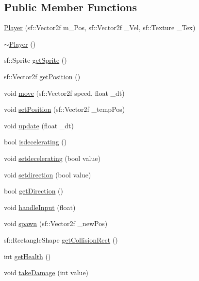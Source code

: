 \subsection*{Public Member Functions}
\begin{DoxyCompactItemize}
\item 
\hyperlink{class_player_a50b4f692a8315358192c8d955cf1250d}{Player} (sf\+::\+Vector2f m\+\_\+\+Pos, sf\+::\+Vector2f \+\_\+\+Vel, sf\+::\+Texture \+\_\+\+Tex)
\item 
\hyperlink{class_player_a749d2c00e1fe0f5c2746f7505a58c062}{$\sim$\+Player} ()
\item 
sf\+::\+Sprite \hyperlink{class_player_aabef659f696be314cdb705a1ce77ec2a}{get\+Sprite} ()
\item 
sf\+::\+Vector2f \hyperlink{class_player_a23356f99a9de86d3d47eadb679b332dc}{get\+Position} ()
\item 
void \hyperlink{class_player_a1b72ddc438471f7feb33b2b0b32cf303}{move} (sf\+::\+Vector2f speed, float \+\_\+dt)
\item 
void \hyperlink{class_player_aa37cc22b7a4862357cc70ae8f1f87396}{set\+Position} (sf\+::\+Vector2f \+\_\+temp\+Pos)
\item 
void \hyperlink{class_player_a71a11d7f337c312add448fe752e55b51}{update} (float \+\_\+dt)
\item 
bool \hyperlink{class_player_af318e11ad06e49d34f6a2ad4e4310e06}{isdecelerating} ()
\item 
void \hyperlink{class_player_a1f28fd8b1c747434ba36b0127b61713b}{setdecelerating} (bool value)
\item 
void \hyperlink{class_player_a002f775383954913c852beedca3a2258}{setdirection} (bool value)
\item 
bool \hyperlink{class_player_a55ab1bb46619242418ef5c7d104efe23}{get\+Direction} ()
\item 
void \hyperlink{class_player_a4d9c040f4b766e3052369bae0fd116d7}{handle\+Input} (float)
\item 
void \hyperlink{class_player_a6258e03705f093472c49af6d909fdad1}{spawn} (sf\+::\+Vector2f \+\_\+new\+Pos)
\item 
sf\+::\+Rectangle\+Shape \hyperlink{class_player_ab23a6224f848e8b8fab134c355b8a8de}{get\+Collision\+Rect} ()
\item 
int \hyperlink{class_player_abcb15d249bed9a4ab0ab86b52b0d747a}{get\+Health} ()
\item 
void \hyperlink{class_player_af92779e4722eee7813fd6497e3e15e18}{take\+Damage} (int value)
\item 

\end{DoxyCompactItemize}
